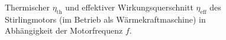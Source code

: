 \documentclass[12pt,a4paper,german]{scrartcl}
\numberwithin{equation}{section}
\begin{document}
  \begin{figure}[H]
    \centering
    
    \caption{Thermischer $\eta_\text{th}$ und effektiver Wirkungsquerschnitt $\eta_\text{eff}$ des Stirlingmotors (im Betrieb als Wärmekraftmaschine) in Abhängigkeit der Motorfrequenz $f$.}
  \end{figure}
\end{document}
